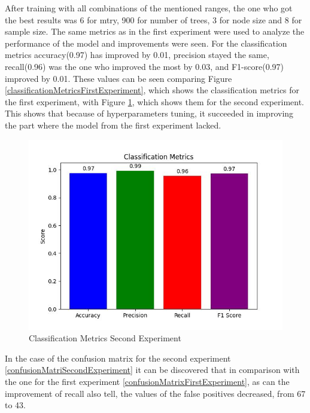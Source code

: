 \documentclass[3p,times,procedia]{elsarticle}
\begin{document}
After training with all combinations of the mentioned ranges, the one who got the best results was 6 for mtry, 900 for number of trees, 3 for node size and 8 for sample size. The same metrics as in the first experiment were used to analyze the performance of the model and improvements were seen. For the classification metrics accuracy(0.97) has improved by 0.01, precision stayed the same, recall(0.96) was the one who improved the most by 0.03, and F1-score(0.97) improved by 0.01. These values can be seen comparing Figure \ref{classificationMetricsFirstExperiment}, which shows the classification metrics for the first experiment, with Figure \ref{classificationMetricsSecondExperiment}, which shows them for the second experiment. This shows that because of hyperparameters tuning, it succeeded in improving the part where the model from the first experiment lacked.

\begin{figure}[htbp]
	\centering
		\includegraphics[scale=0.8]{./figures/metrics/experiment2English/classificationMetrics.jpg}
	\caption{Classification Metrics Second Experiment}
	\label{classificationMetricsSecondExperiment}
\end{figure}

In the case of the confusion matrix for the second experiment \ref{confusionMatriSecondExperiment} it can be discovered that in comparison with the one for the first experiment \ref{confusionMatrixFirstExperiment}, as can the improvement of recall also tell, the values of the false positives decreased, from 67 to 43.
\end{document}
